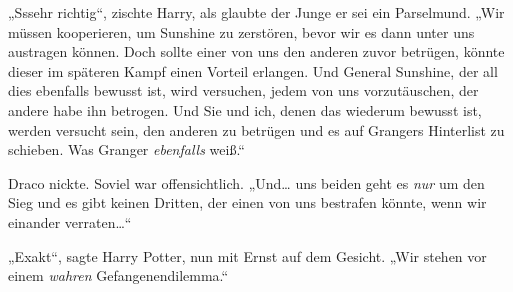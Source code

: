 „Sssehr richtig“, zischte Harry, als glaubte der Junge er sei ein Parselmund. „Wir müssen kooperieren, um Sunshine zu zerstören, bevor wir es dann unter uns austragen können. Doch sollte einer von uns den anderen zuvor betrügen, könnte dieser im späteren Kampf einen Vorteil erlangen. Und General Sunshine, der all dies ebenfalls bewusst ist, wird versuchen, jedem von uns vorzutäuschen, der andere habe ihn betrogen. Und Sie und ich, denen das wiederum bewusst ist, werden versucht sein, den anderen zu betrügen und es auf Grangers Hinterlist zu schieben. Was Granger \emph{ebenfalls} weiß.“

Draco nickte. Soviel war offensichtlich. „Und… uns beiden geht es \emph{nur} um den Sieg und es gibt keinen Dritten, der einen von uns bestrafen könnte, wenn wir einander verraten…“

„Exakt“, sagte Harry Potter, nun mit Ernst auf dem Gesicht. „Wir stehen vor einem \emph{wahren} Gefangenendilemma.“

